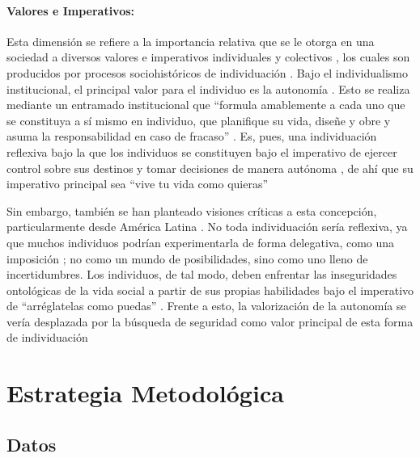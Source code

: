 \documentclass[12pt,twoside]{templates/facsothesis}
\begin{document}
\hypertarget{valores-e-imperativos}{%
\subsubsection{Valores e Imperativos:}\label{valores-e-imperativos}}

Esta dimensión se refiere a la importancia relativa que se le otorga en una sociedad a diversos valores e imperativos individuales y colectivos \citep{brewer2007}, los cuales son producidos por procesos sociohistóricos de individuación \citep{martuccelli2018}. Bajo el individualismo institucional, el principal valor para el individuo es la autonomía \citep{martuccelli2010}. Esto se realiza mediante un entramado institucional \citep{martuccelli2018} que ``formula amablemente a cada uno que se constituya a sí mismo en individuo, que planifique su vida, diseñe y obre y asuma la responsabilidad en caso de fracaso'' \citep[p.~59]{robles2001}. Es, pues, una individuación reflexiva bajo la que los individuos se constituyen bajo el imperativo de ejercer control sobre sus destinos y tomar decisiones de manera autónoma \citep{silvapalacios2015}, de ahí que su imperativo principal sea ``vive tu vida como quieras'' \citep{robles2001}

Sin embargo, también se han planteado visiones críticas a esta concepción, particularmente desde América Latina \citep{araujo2012, robles2001}. No toda individuación sería reflexiva, ya que muchos individuos podrían experimentarla de forma delegativa, como una imposición \citep{silvapalacios2015}; no como un mundo de posibilidades, sino como uno lleno de incertidumbres. Los individuos, de tal modo, deben enfrentar las inseguridades ontológicas de la vida social a partir de sus propias habilidades bajo el imperativo de ``arréglatelas como puedas'' \citep{araujo2014, robles2001}. Frente a esto, la valorización de la autonomía se vería desplazada por la búsqueda de seguridad como valor principal de esta forma de individuación \citep{silvapalacios2015}

\hypertarget{estrategia-metodoluxf3gica}{%
\chapter{Estrategia Metodológica}\label{estrategia-metodoluxf3gica}}

\hypertarget{datos}{%
\section{Datos}\label{datos}}
\end{document}
